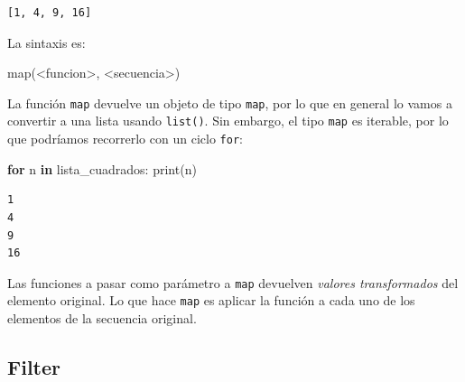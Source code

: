 \documentclass[
  letterpaper,
  DIV=11,
  numbers=noendperiod]{scrreprt}
\newenvironment{Shaded}{\begin{snugshade}}{\end{snugshade}}
\newcommand{\BuiltInTok}[1]{\textcolor[rgb]{0.00,0.23,0.31}{#1}}
\newcommand{\ControlFlowTok}[1]{\textcolor[rgb]{0.00,0.23,0.31}{\textbf{#1}}}
\newcommand{\KeywordTok}[1]{\textcolor[rgb]{0.00,0.23,0.31}{\textbf{#1}}}
\newcommand{\NormalTok}[1]{\textcolor[rgb]{0.00,0.23,0.31}{#1}}
\newcommand{\OperatorTok}[1]{\textcolor[rgb]{0.37,0.37,0.37}{#1}}
\begin{document}
\begin{verbatim}
[1, 4, 9, 16]
\end{verbatim}

La sintaxis es:

\begin{Shaded}
\begin{Highlighting}[]
\BuiltInTok{map}\NormalTok{(}\OperatorTok{\textless{}}\NormalTok{funcion}\OperatorTok{\textgreater{}}\NormalTok{, }\OperatorTok{\textless{}}\NormalTok{secuencia}\OperatorTok{\textgreater{}}\NormalTok{)}
\end{Highlighting}
\end{Shaded}

La función \texttt{map} devuelve un objeto de tipo \texttt{map}, por lo
que en general lo vamos a convertir a una lista usando \texttt{list()}.
Sin embargo, el tipo \texttt{map} es iterable, por lo que podríamos
recorrerlo con un ciclo \texttt{for}:

\begin{Shaded}
\begin{Highlighting}[]
\ControlFlowTok{for}\NormalTok{ n }\KeywordTok{in}\NormalTok{ lista\_cuadrados:}
  \BuiltInTok{print}\NormalTok{(n)}
\end{Highlighting}
\end{Shaded}

\begin{verbatim}
1
4
9
16
\end{verbatim}

\begin{tcolorbox}[enhanced jigsaw, arc=.35mm, toptitle=1mm, colframe=quarto-callout-tip-color-frame, bottomtitle=1mm, opacitybacktitle=0.6, colbacktitle=quarto-callout-tip-color!10!white, leftrule=.75mm, coltitle=black, toprule=.15mm, titlerule=0mm, title=\textcolor{quarto-callout-tip-color}{\faLightbulb}\hspace{0.5em}{Tip}, bottomrule=.15mm, rightrule=.15mm, colback=white, breakable, opacityback=0, left=2mm]

Las funciones a pasar como parámetro a \texttt{map} devuelven
\emph{valores transformados} del elemento original. Lo que hace
\texttt{map} es aplicar la función a cada uno de los elementos de la
secuencia original.

\end{tcolorbox}

\subsection{Filter}\label{filter}
\end{document}

